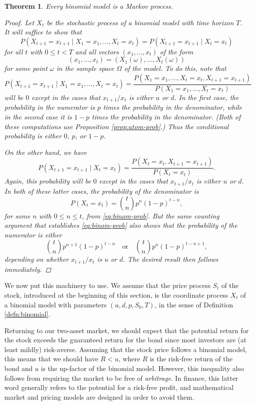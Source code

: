 \documentclass[reqno]{amsart}
\newtheorem{thm}{Theorem}[section]
\theoremstyle{definition}
\numberwithin{equation}{section}
\begin{document}
\begin{thm}
Every binomial model is a Markov process.
\begin{proof}
Let $X_t$ be the stochastic process of a binomial model with time horizon $T$. It will suffice to show that
	\[
	P\left(X_{t+1} = x_{t+1} \mid X_1=x_1, \ldots,X_t=x_t\right) = P\left(X_{t+1} = x_{t+1} \mid X_t=x_t\right)
	\]
for all $t$ with $0 \leq t < T$ and all vectors $(x_1,\ldots,x_t)$ of the form
	\[
	(x_1,\ldots,x_t) = (X_1(\omega),\ldots,X_t(\omega))
	\]
for some point $\omega$ in the sample space $\Omega$ of the model. To do this, note that
	\[
	P\left(X_{t+1} = x_{t+1} \mid X_1=x_1, \ldots,X_t=x_t\right) = \frac{P(X_1=x_1, \ldots,X_t=x_t,X_{t+1}=x_{t+1})}{P(X_1=x_1, \ldots,X_t=x_t)}
	\]
will be $0$ except in the cases that $x_{t+1}/x_t$ is either $u$ or $d$. In the first case, the probability in the numerator is $p$ times the probability in the denominator, while in the second case it is $1-p$ times the probability in the denominator. (Both of these computations use Proposition \ref{prop:atom-prob}.) Thus the conditional probability is either $0$, $p$, or $1-p$.

On the other hand, we have
	\[
	P\left(X_{t+1} = x_{t+1} \mid X_t=x_t\right) = \frac{P(X_t=x_t, X_{t+1}=x_{t+1})}{P(X_t=x_t)}.
	\]
Again, this probability will be $0$ except in the cases that $x_{t+1}/x_t$ is either $u$ or $d$. In both of these latter cases, the probability of the denominator is
	\[
	P(X_t=x_t) = \binom{t}{n} p^n (1-p)^{t-n},
	\]
for some $n$ with $0\leq n \leq t$, from \eqref{eq:binom-prob}. But the same counting argument that establishes \eqref{eq:binom-prob} also shows that the probability of the numerator is either
	\[
	\binom{t}{n} p^{n+1} (1-p)^{t-n} \quad \text{or} \quad \binom{t}{n} p^{n} (1-p)^{t-n+1},
	\]
depending on whether $x_{t+1}/x_t$ is $u$ or $d$. The desired result then follows immediately.
\end{proof}
\end{thm}

We now put this machinery to use. We assume that the price process $S_t$ of the stock, introduced at the beginning of this section, is the coordinate process $X_t$ of a binomial model with parameters $(u,d,p,S_0,T)$, in the sense of Definition \ref{defn:binomial}.

Returning to our two-asset market, we should expect that the potential return for the stock exceeds the guaranteed return for the bond since most investors are (at least mildly) risk-averse. Assuming that the stock price follows a binomial model, this means that we should have $R < u$, where $R$ is the risk-free return of the bond and $u$ is the up-factor of the binomial model. However, this inequality also follows from requiring the market to be free of \textit{arbitrage}. In finance, this latter word generally refers to the potential for a risk-free profit, and mathematical market and pricing models are designed in order to avoid them.
\end{document}
